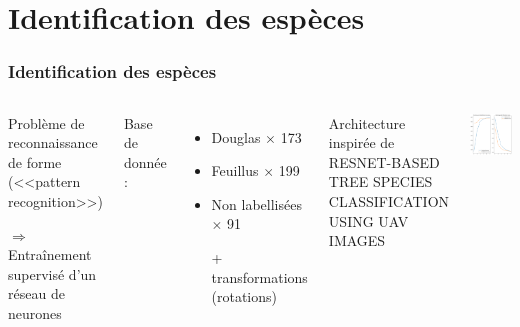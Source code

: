 \documentclass{beamer}
\begin{document}
\section{Identification des espèces}

\begin{frame}
	\frametitle{Identification des espèces}
	\begin{columns}
		\begin{center}
		Problème de reconnaissance de forme (<<pattern recognition>>)

		$\Rightarrow$  Entraînement supervisé d'un réseau de neurones\\
		\end{center}
		Base de donnée : 
		\begin{itemize}
			\item Douglas $\times$ 173
			\item Feuillus $\times$ 199
			\item Non labellisées $\times$ 91
			\item[+] transformations (rotations)
		\end{itemize}

		Architecture inspirée de RESNET-BASED TREE SPECIES CLASSIFICATION USING UAV IMAGES
	
	
		\centering
		\includegraphics[scale=0.33]{train.png}
	\end{columns}
	
\end{frame}
\end{document}
